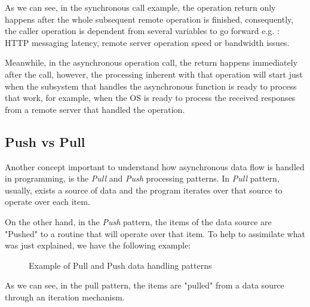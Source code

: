 	As we can see, in the synchronous call example, the operation return only happens after the whole subsequent remote operation is finished, consequently, the caller operation is dependent from several variables to go forward e.g. : HTTP messaging latency, remote server operation speed or bandwidth issues. 

	Meanwhile, in the asynchronous operation call, the return happens immediately after the call, however, the processing inherent with that operation will start just when the subsystem that handles the asynchronous function is ready to process that work, for example, when the OS is ready to process the received responses from a remote server that handled the operation.


	\subsection{Push vs Pull} 
	\label{sub:pushvpull}
	
	Another concept important to understand how asynchronous data flow is handled in programming, is the \textit{Pull} and \textit{Push} processing patterns.
	In \textit{Pull} pattern, usually, exists a source of data and the program iterates over that source to operate over each item. 
	
	On the other hand, in the \textit{Push} pattern, the items of the data source are "Pushed" to a routine that will operate over that item.
	To help to assimilate what was just explained, we have the following example:

	\begin{figure}[H]
		\centering
		\begin{subfigure}[h]{1.2\textwidth}
			\centering
			\caption{}
		 \end{subfigure}	
	\qquad\qquad
		 \begin{subfigure}[h]{1.2\textwidth}
			\centering
			\caption{}
		\end{subfigure}		
	  \caption{Example of Pull and Push data handling patterns}
	  \label{fig:exmplo2}
	\end{figure}
	\clearpage

	As we can see, in the pull pattern, the items are "pulled" from a data source through an iteration mechanism. 
	
